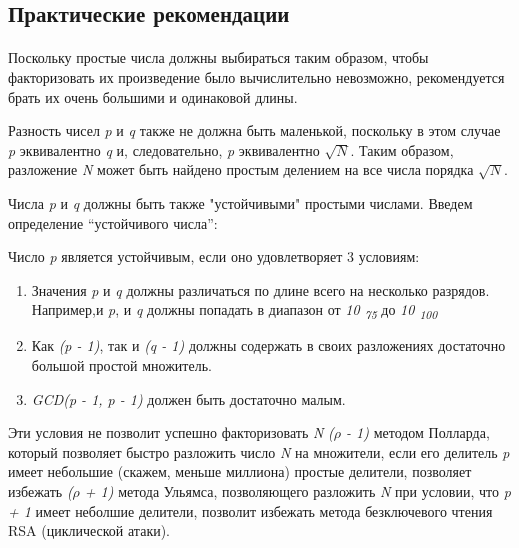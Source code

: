 \subsection{Практические рекомендации}

\paragraph{} Поскольку простые числа должны выбираться таким образом, чтобы факторизовать их произведение было вычислительно невозможно, 
рекомендуется брать их очень большими и одинаковой длины.

  Разность чисел \textit{p} и \textit{q} также не должна быть маленькой, поскольку в этом случае \textit{p} эквивалентно \textit{q} и,
следовательно, \textit{p} эквивалентно \textit{{$\sqrt{N}$}}. Таким образом, разложение \textit{N} может быть найдено простым делением 
на все числа порядка \textit{{$\sqrt{N}$}}.

  Числа \textit{p} и \textit{q} должны быть также "устойчивыми" простыми числами. Введем определение “устойчивого числа”:
  
    \begin{definition}   

      Число \textit{p} является устойчивым, если оно удовлетворяет 3 условиям:
	\begin{enumerate}
	 \item Значения \textit{p} и \textit{q} должны различаться по длине всего на несколько разрядов. Например,и \textit{p}, 
и \textit{q} должны попадать в диапазон от \textit{10\textsubscript{ 75}} до \textit{10\textsubscript{ 100}}
	 \item Как \textit{(p - 1)}, так и \textit{(q - 1)} должны содержать в своих разложениях достаточно большой простой множитель.
	 \item \textit{GCD(p - 1, p - 1)} должен быть достаточно малым.
	\end{enumerate}

    \end{definition}

  Эти условия не позволит успешно факторизовать \textit{N} \textit{({$\rho$} - 1)} методом Полларда, который позволяет быстро разложить 
число \textit{N} на множители, если его делитель \textit{p} имеет небольшие (скажем, меньше миллиона) простые делители, позволяет 
избежать \textit{({$\rho$} + 1)} метода Ульямса, позволяющего разложить \textit{N} при условии, что \textit{p + 1} имеет неболшие делители, 
позволит избежать метода безключевого чтения RSA (циклической атаки).

